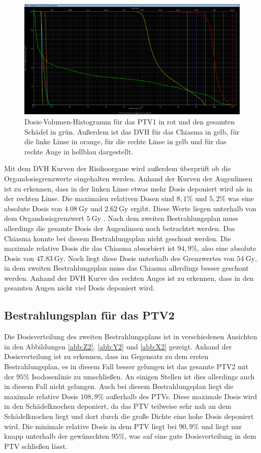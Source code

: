 \begin{figure}[H]
  \centering
  \includegraphics[width=\textwidth]{Bilder/Teilhirn1_DVH.png}
  \caption{Dosis-Volumen-Histogramm für das PTV1 in rot und den gesamten Schädel in grün. Außerdem ist das DVH für das Chiasma in gelb, für die linke Linse in orange, für die rechte Linse in gelb und für das rechte Auge in hellblau dargestellt.}
  \label{abb:DVH}
\end{figure}

Mit dem DVH Kurven der Risikoorgane wird außerdem überprüft ob die Organdosisgrenzwerte eingehalten werden.
Anhand der Kurven der Augenlinsen ist zu erkennen, dass in der linken Linse etwas mehr Dosis deponiert wird
als in der rechten Linse. Die maximalen relativen Dosen sind $8,1\%$ und $5,2\%$ was eine absolute Dosis von
$\SI{4.08}{\gray}$ und $\SI{2.62}{\gray}$ ergibt. Diese Werte liegen unterhalb von dem Organdosisgrenzwert
$\SI{5}{\gray}$ \cite{grenz}. Nach dem zweiten Bestrahlungsplan muss allerdings die gesamte Dosis der Augenlinsen noch betrachtet werden.
Das Chiasma konnte bei diesem Bestrahlungsplan nicht geschont werden. Die maximale relative Dosis die das Chiasma absorbiert ist
$94,9\%$, also eine absolute Dosis von $\SI{47.83}{\gray}$. Noch liegt diese Dosis unterhalb des Grenzwertes von
$\SI{54}{\gray}$, in dem zweiten Bestrahlungsplan muss das Chiasma allerdings besser geschont werden.
Anhand der DVH Kurve des rechten Auges ist zu erkennen, dass in den gesamten Augen nicht viel Dosis deponiert wird.


\subsection*{Bestrahlungsplan für das PTV2}

Die Dosisverteilung des zweiten Bestrahlungsplans ist in verschiedenen Ansichten in den
Abbildungen \ref{abb:Z2}, \ref{abb:Y2} und \ref{abb:X2} gezeigt. Anhand der Dosisverteilung ist
zu erkennen, dass im Gegensatz zu dem ersten Bestrahlungsplan, es in diesem Fall besser gelungen
ist das gesamte PTV2 mit der $95\%$ Isodosenlinie zu umschließen. An einigen Stellen ist dies allerdings auch in
diesem Fall nicht gelungen. Auch bei diesem Bestrahlungsplan liegt die maximale relative Dosis $108,9\%$ außerhalb des
PTVs. Diese maximale Dosis wird in den Schädelknochen deponiert, da das PTV teilweise sehr nah an dem Schädelknochen liegt und dort durch die
große Dichte eine hohe Dosis deponiert wird. Die minimale relative Dosis in dem PTV liegt bei $90,9\%$ und liegt nur knapp unterhalb der gewünschten
$95\%$, was auf eine gute Dosisverteilung in dem PTV schließen lässt.


